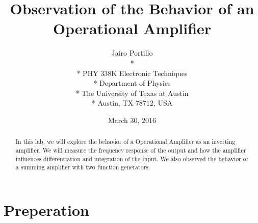 \documentclass[11pt,letterpaper,onecolumn]{article}
\begin{document}

\title{\bf Observation of the Behavior of an Operational Amplifier}

\author{
 Jairo Portillo \\*
  \\*
 PHY 338K Electronic Techniques \\*
 Department of Physics \\*
 The University of Texas at Austin \\*
 Austin, TX 78712, USA
}
\date{March 30, 2016}


\maketitle


\begin{abstract}

In this lab, we will explore the behavior of a Operational Amplifier as an inverting amplifier. We will measure the frequency response of the output and how the amplifier influences differentiation and integration of the input. We also observed the behavior of a summing amplifier with two function generators.

\end{abstract}



\section{Preperation}
\end{document}
